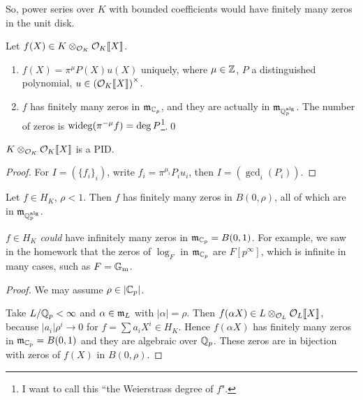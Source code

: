 So, power series over $K$ with bounded coefficients would have finitely many zeros in the unit disk.
\begin{corollary}\label{zero of power series with bounded coefficients}
    Let $f(X)\in K\otimes_{\mathcal{O}_K}\mathcal{O}_K\llbracket X \rrbracket$.\begin{enumerate}
        \item $f(X) = \pi^\mu P(X) u(X)$ uniquely, where $\mu\in \mathbb{Z}$, $P$ a distinguished polynomial, $u\in\left( \mathcal{O}_K\llbracket X \rrbracket \right)^\times$.
        \item $f$ has finitely many zeros in $\mathfrak{m}_{\mathbb{C}_p}$, and they are actually in $\mathfrak{m}_{\mathbb{Q}_p^{\mathrm{alg}}}$. The number of zeros is $\operatorname{wideg} (\pi^{-\mu} f) = \deg P$\footnote{I want to call this ``the Weierstrass degree of $f$".}.\qed
    \end{enumerate}
\end{corollary}
\begin{corollary}
    $K\otimes_{\mathcal{O}_K}\mathcal{O}_K\llbracket X \rrbracket$ is a PID.
\end{corollary}
\begin{proof}
    For $I = (\{f_i\}_i)$, write $f_i = \pi^{\mu_i}P_iu_i$, then $I = \left(\gcd_i (P_i)\right)$.
\end{proof}

\begin{theorem}
    Let $f\in H_K$, $\rho < 1$. Then $f$ has finitely many zeros in $B(0, \rho)$, all of which are in $\mathfrak{m}_{\mathbb{Q}_p^{\mathrm{alg}}}$.
\end{theorem}
\begin{remark}
    $f\in H_K$ \textit{could} have infinitely many zeros in $\mathfrak{m}_{\mathbb{C}_p} = B(0, 1)$.
    For example, we saw in the homework that the zeros of $\log_F$ in $\mathfrak{m}_{\mathbb{C}_p}$ are $F[p^\infty]$, which is infinite in many cases, such as $F = {\mathbb{G}_{\mathrm{m}}}$.
\end{remark}
\begin{proof}
    We may assume $\rho\in|\mathbb{C}_p|$.

    Take $L/\mathbb{Q}_p < \infty$ and $\alpha\in\mathfrak{m}_L$ with $|\alpha| = \rho$.
    Then $f(\alpha X)\in L\otimes_{\mathcal{O}_L}\mathcal{O}_L\llbracket X \rrbracket$, because $|a_i|\rho^i\to 0$ for $f = \sum a_iX^i\in H_K$.
    Hence $f(\alpha X)$ has finitely many zeros in $\mathfrak{m}_{\mathbb{C}_p} = B(0, 1)$ and they are algebraic over $\mathbb{Q}_p$.
    These zeros are in bijection with zeros of $f(X)$ in $B(0, \rho)$. 
\end{proof}

